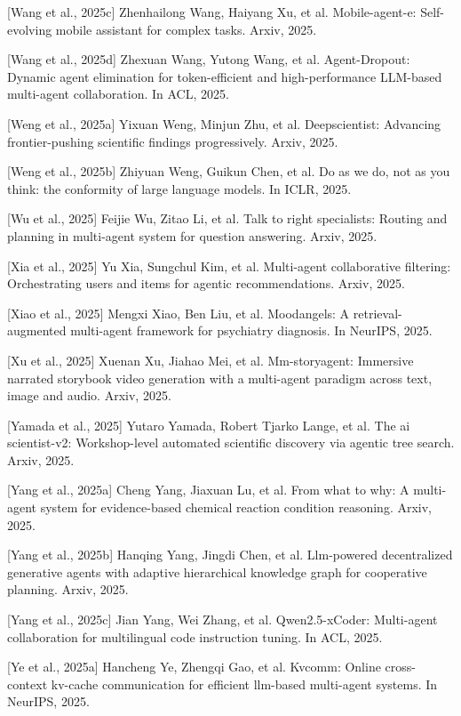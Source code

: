\documentclass[UTF8,a4paper,12pt]{article}
\begin{document}
{[}Wang et al., 2025c{]} Zhenhailong Wang, Haiyang Xu, et al. Mobile-agent-e: Self-evolving mobile assistant for complex tasks. Arxiv, 2025.

{[}Wang et al., 2025d{]} Zhexuan Wang, Yutong Wang, et al. Agent-Dropout: Dynamic agent elimination for token-efficient and high-performance LLM-based multi-agent collaboration. In ACL, 2025.

{[}Weng et al., 2025a{]} Yixuan Weng, Minjun Zhu, et al. Deepscientist: Advancing frontier-pushing scientific findings progressively. Arxiv, 2025.

{[}Weng et al., 2025b{]} Zhiyuan Weng, Guikun Chen, et al. Do as we do, not as you think: the conformity of large language models. In ICLR, 2025.

{[}Wu et al., 2025{]} Feijie Wu, Zitao Li, et al. Talk to right specialists: Routing and planning in multi-agent system for question answering. Arxiv, 2025.

{[}Xia et al., 2025{]} Yu Xia, Sungchul Kim, et al. Multi-agent collaborative filtering: Orchestrating users and items for agentic recommendations. Arxiv, 2025.

{[}Xiao et al., 2025{]} Mengxi Xiao, Ben Liu, et al. Moodangels: A retrieval-augmented multi-agent framework for psychiatry diagnosis. In NeurIPS, 2025.

{[}Xu et al., 2025{]} Xuenan Xu, Jiahao Mei, et al. Mm-storyagent: Immersive narrated storybook video generation with a multi-agent paradigm across text, image and audio. Arxiv, 2025.

{[}Yamada et al., 2025{]} Yutaro Yamada, Robert Tjarko Lange, et al. The ai scientist-v2: Workshop-level automated scientific discovery via agentic tree search. Arxiv, 2025.

{[}Yang et al., 2025a{]} Cheng Yang, Jiaxuan Lu, et al. From what to why: A multi-agent system for evidence-based chemical reaction condition reasoning. Arxiv, 2025.

{[}Yang et al., 2025b{]} Hanqing Yang, Jingdi Chen, et al. Llm-powered decentralized generative agents with adaptive hierarchical knowledge graph for cooperative planning. Arxiv, 2025.

{[}Yang et al., 2025c{]} Jian Yang, Wei Zhang, et al. Qwen2.5-xCoder: Multi-agent collaboration for multilingual code instruction tuning. In ACL, 2025.

{[}Ye et al., 2025a{]} Hancheng Ye, Zhengqi Gao, et al. Kvcomm: Online cross-context kv-cache communication for efficient llm-based multi-agent systems. In NeurIPS, 2025.
\end{document}
